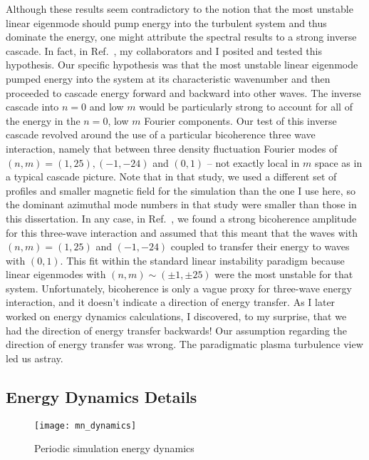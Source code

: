 Although these results seem contradictory to the notion that the most unstable linear eigenmode should pump energy into the turbulent system and thus dominate the energy, one might attribute
the spectral results to a strong inverse cascade. 
In fact, in Ref.~\cite{Umansky2011}, my collaborators and I posited and tested this hypothesis. Our specific hypothesis was that the most unstable linear eigenmode pumped energy into the system at
its characteristic wavenumber and then proceeded to cascade energy forward and backward into other waves. The inverse cascade into $n=0$ and low $m$ would be particularly strong to account for all of
the energy in the $n=0$, low $m$ Fourier components.
Our test of this inverse cascade revolved around the use of a particular bicoherence three wave interaction, namely that between
three density fluctuation Fourier modes of $(n,m)=(1,25),(-1,-24)$ and $(0,1)$ -- not exactly local in $m$ space as in a typical cascade picture. 
Note that in that study, we used a different set of profiles and smaller magnetic field for the simulation 
than the one I use here, so the dominant azimuthal mode numbers in that study were smaller than those in this dissertation.
In any case, in Ref.~\cite{Umansky2011}, we found a strong bicoherence amplitude for this three-wave interaction
and assumed that this meant that the waves with $(n,m)=(1,25)$ and $(-1,-24)$ coupled to transfer their energy
to waves with $(0,1)$. This fit within the standard linear instability paradigm because linear eigenmodes with $(n,m) \sim (\pm 1, \pm 25)$ were the most unstable for that system.
Unfortunately, bicoherence is only a vague proxy for three-wave energy interaction, and it doesn't indicate a direction of energy transfer. 
As I later worked on energy dynamics calculations, I discovered, to my surprise, that we had the direction of energy transfer backwards! 
Our assumption regarding the direction of energy transfer was wrong. The paradigmatic plasma turbulence view led us astray.


\subsection{Energy Dynamics Details}
\label{ss_dyn_details}


\begin{figure}
\centerline{\texttt{[image: mn\_dynamics]}}
\caption{Periodic simulation energy dynamics}
\label{mn_dynamics}
\end{figure}


